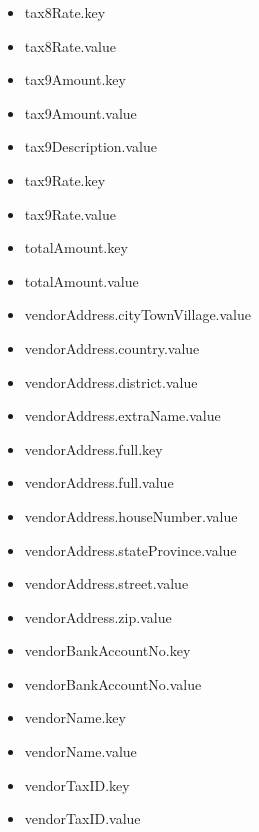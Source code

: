 \begin{multicols}{2}
\begin{itemize}
\item[] tax8Rate.key
\item[] tax8Rate.value
\item[] tax9Amount.key
\item[] tax9Amount.value
\item[] tax9Description.value
\item[] tax9Rate.key
\item[] tax9Rate.value
\item[] totalAmount.key
\item[] totalAmount.value
\item[] vendorAddress.cityTownVillage.value
\item[] vendorAddress.country.value
\item[] vendorAddress.district.value
\item[] vendorAddress.extraName.value
\item[] vendorAddress.full.key
\item[] vendorAddress.full.value
\item[] vendorAddress.houseNumber.value
\item[] vendorAddress.stateProvince.value
\item[] vendorAddress.street.value
\item[] vendorAddress.zip.value
\item[] vendorBankAccountNo.key
\item[] vendorBankAccountNo.value
\item[] vendorName.key
\item[] vendorName.value
\item[] vendorTaxID.key
\item[] vendorTaxID.value
\end{itemize}
\end{multicols}
\cleardoublepage




